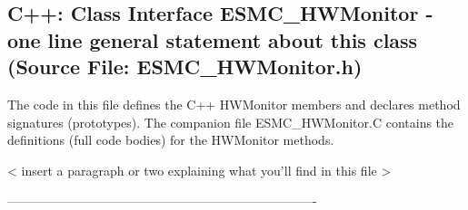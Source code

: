  
\parskip        0pt
\parindent      0pt
\baselineskip  11pt
 
\def\bv{\begin{verbatim}}
\def\ev{\end{verbatim}}
\def\be{\begin{equation}}
\def\ee{\end{equation}}
\def\bea{\begin{eqnarray}}
\def\eea{\end{eqnarray}}
\def\bi{\begin{itemize}}
\def\ei{\end{itemize}}
\def\bn{\begin{enumerate}}
\def\en{\end{enumerate}}
\def\bd{\begin{description}}
\def\ed{\end{description}}
\def\({\left (}
\def\){\right )}
\def\[{\left [}
\def\]{\right ]}
\def\<{\left  \langle}
\def\>{\right \rangle}
\def\cI{{\cal I}}
\def\diag{\mathop{\rm diag}}
\def\tr{\mathop{\rm tr}}


 
\subsection{C++:  Class Interface ESMC\_HWMonitor - one line general statement about this class (Source File: ESMC\_HWMonitor.h)}


  
  
   The code in this file defines the C++ HWMonitor members and declares method 
   signatures (prototypes).  The companion file ESMC\_HWMonitor.C contains
   the definitions (full code bodies) for the HWMonitor methods.
  
   < insert a paragraph or two explaining what you'll find in this file >
  
  -------------------------------------------------------------------------
   
